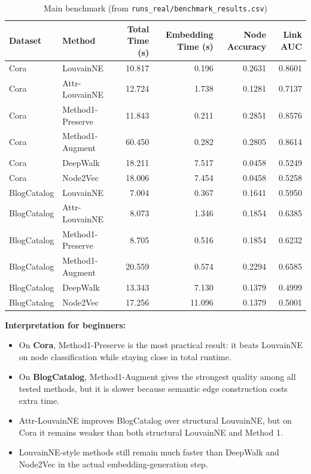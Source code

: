 \documentclass[10pt,twoside,twocolumn]{article}
\begin{document}
\begin{table}[t]
\centering
\caption{Main benchmark (from \texttt{runs\_real/benchmark\_results.csv})}
\begin{tabular}{llrrrr}
\toprule
Dataset & Method & Total Time (s) & Embedding Time (s) & Node Accuracy & Link AUC \\
\midrule
Cora & LouvainNE & 10.817 & 0.196 & 0.2631 & 0.8601 \\
Cora & Attr-LouvainNE & 12.724 & 1.738 & 0.1281 & 0.7137 \\
Cora & Method1-Preserve & 11.843 & 0.211 & 0.2851 & 0.8576 \\
Cora & Method1-Augment & 60.450 & 0.282 & 0.2805 & 0.8614 \\
Cora & DeepWalk & 18.211 & 7.517 & 0.0458 & 0.5249 \\
Cora & Node2Vec & 18.006 & 7.454 & 0.0458 & 0.5258 \\
\midrule
BlogCatalog & LouvainNE & 7.004 & 0.367 & 0.1641 & 0.5950 \\
BlogCatalog & Attr-LouvainNE & 8.073 & 1.346 & 0.1854 & 0.6385 \\
BlogCatalog & Method1-Preserve & 8.705 & 0.516 & 0.1854 & 0.6232 \\
BlogCatalog & Method1-Augment & 20.559 & 0.574 & 0.2294 & 0.6585 \\
BlogCatalog & DeepWalk & 13.343 & 7.130 & 0.1379 & 0.4999 \\
BlogCatalog & Node2Vec & 17.256 & 11.096 & 0.1379 & 0.5001 \\
\bottomrule
\end{tabular}
\end{table}

\textbf{Interpretation for beginners:}
\begin{itemize}
  \item On \textbf{Cora}, Method1-Preserve is the most practical result: it beats LouvainNE on node classification while staying close in total runtime.
  \item On \textbf{BlogCatalog}, Method1-Augment gives the strongest quality among all tested methods, but it is slower because semantic edge construction costs extra time.
  \item Attr-LouvainNE improves BlogCatalog over structural LouvainNE, but on Cora it remains weaker than both structural LouvainNE and Method 1.
  \item LouvainNE-style methods still remain much faster than DeepWalk and Node2Vec in the actual embedding-generation step.
\end{itemize}
\end{document}
